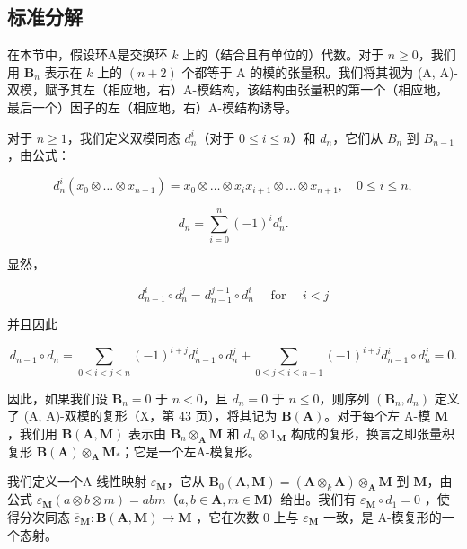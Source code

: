 \subsection{标准分解}

在本节中，假设环A是交换环 \(k\) 上的（结合且有单位的）代数。对于 \(n \geqslant 0\)，我们用 \(\mathbf{B}_n\) 表示在 \(k\) 上的 \((n + 2)\) 个都等于 A 的模的张量积。我们将其视为 (A, A)-双模，赋予其左（相应地，右）A-模结构，该结构由张量积的第一个（相应地，最后一个）因子的左（相应地，右）A-模结构诱导。

对于 \(n \geqslant 1\)，我们定义双模同态 \(d_n^i\)（对于 \(0 \leqslant i \leqslant n\)）和 \(d_n\)，它们从 \(B_n\) 到 \(B_{n-1}\)，由公式：

\[
d _ {n} ^ {i} (x _ {0} \otimes \ldots \otimes x _ {n + 1}) = x _ {0} \otimes \ldots \otimes x _ {i} x _ {i + 1} \otimes \ldots \otimes x _ {n + 1}, \quad 0 \leqslant i \leqslant n,
\]

\[
d _ {n} = \sum_ {i = 0} ^ {n} (- 1) ^ {i} d _ {n} ^ {i}.
\]

显然，

\[
d _ {n - 1} ^ {i} \circ d _ {n} ^ {j} = d _ {n - 1} ^ {j - 1} \circ d _ {n} ^ {i} \quad \text { for } \quad i <   j
\]

并且因此

\[
d _ {n - 1} \circ d _ {n} = \sum_ {0 \leqslant i <   j \leqslant n} (- 1) ^ {i + j} d _ {n - 1} ^ {i} \circ d _ {n} ^ {j} + \sum_ {0 \leqslant j \leqslant i \leqslant n - 1} (- 1) ^ {i + j} d _ {n - 1} ^ {i} \circ d _ {n} ^ {j} = 0.
\]

因此，如果我们设 \(\mathbf{B}_n = 0\) 于 \(n < 0\)，且 \(d_n = 0\) 于 \(n \leqslant 0\)，则序列 \((\mathbf{B}_n, d_n)\) 定义了 (A, A)-双模的复形（X，第 43 页），将其记为 \(\mathbf{B}(\mathbf{A})\)。对于每个左 A-模 \(\mathbf{M}\)，我们用 \(\mathbf{B}(\mathbf{A}, \mathbf{M})\) 表示由 \(\mathbf{B}_n \otimes_{\mathbf{A}} \mathbf{M}\) 和 \(d_n \otimes 1_{\mathbf{M}}\) 构成的复形，换言之即张量积复形 \(\mathbf{B}(\mathbf{A}) \otimes_{\mathbf{A}} \mathbf{M}_{*}\)；它是一个左A-模复形。

我们定义一个A-线性映射 \(\varepsilon_{\mathbf{M}}\)，它从 \(\mathbf{B}_{0}(\mathbf{A},\mathbf{M}) = (\mathbf{A}\otimes_{k}\mathbf{A})\otimes_{\mathbf{A}}\mathbf{M}\) 到 \(\mathbf{M}\)，由公式 \(\varepsilon_{\mathbf{M}}(a\otimes b\otimes m) = abm\)（\(a,b\in \mathbf{A},m\in \mathbf{M}\)）给出。我们有 \(\varepsilon_{\mathbf{M}}\circ d_1 = 0\) ，使得分次同态 \(\overline{\varepsilon}_{\mathbf{M}}:\mathbf{B}(\mathbf{A},\mathbf{M})\to \mathbf{M}\) ，它在次数 0 上与 \(\varepsilon_{\mathbf{M}}\) 一致，是 A-模复形的一个态射。

